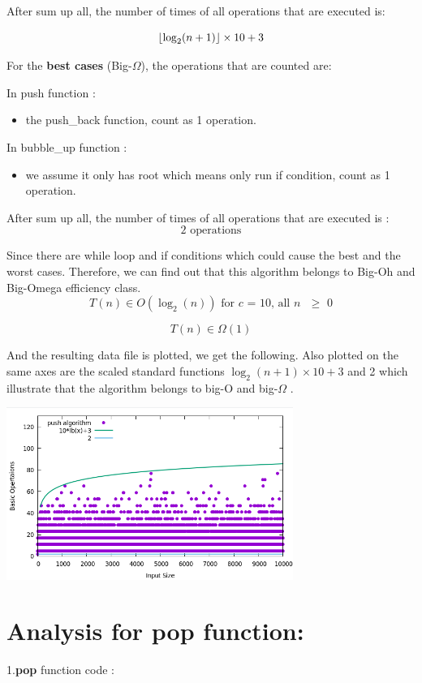 \documentclass[11pt]{article}
\DeclarePairedDelimiter\floor{\lfloor}{\rfloor}
\begin{document}
After sum up all, the number of times of all operations that are executed is$\colon$

\[
 \floor{ \log_2(n+1)} \times 10 + 3
\]

For the \textbf{best cases} (Big-$\Omega$), the operations that are counted are:

In push function $\colon$
\begin{itemize}
\item the push\_back function, count as 1 operation.
\end{itemize}

In bubble\_up function $\colon$
\begin{itemize}
\item we assume it only has root which means only run if condition, count as 1 operation.
\end{itemize}

After sum up all, the number of times of all operations that are executed is :
\[
\text{2 operations}
\]

Since there are while loop and if conditions which could cause the best and the worst cases. Therefore, we can find out that this algorithm belongs to Big-Oh and Big-Omega efficiency class.
\[
    T(n) \in O(\log_2(n)) \text{ for $c$ = 10, all $n$ $\geq$ 0}    
\]

\[
    T(n) \in \Omega(1)
\]

And the resulting data file is plotted, we get the following. Also
plotted on the same axes are the scaled standard functions $ \log_2(n+1) \times 10 + 3$ and
2 which illustrate that the algorithm belongs to big-O and big-$\Omega$ .

\begin{center}
  \includegraphics[width=0.7\textwidth]{push_function.png}
\end{center}
\newpage


\section*{Analysis for pop function:}
1.\textbf{pop} function code $\colon$
\end{document}
